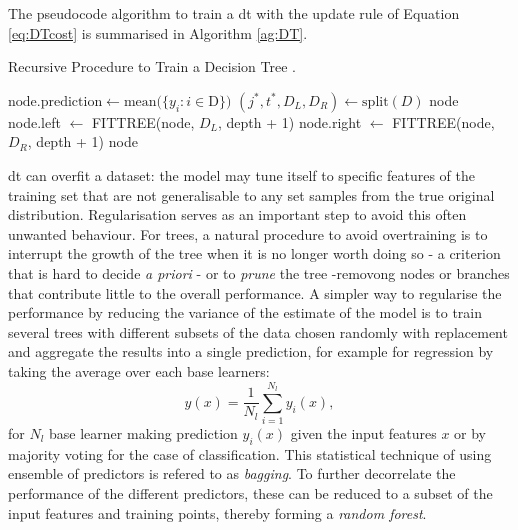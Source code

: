 The pseudocode algorithm to train a \gls{dt} with the update rule of Equation \ref{eq:DTcost} is summarised in Algorithm \ref{ag:DT}. 

\begin{algorithm}
    \caption{Recursive Procedure to Train a Decision Tree \cite{MurphyML}.}
    \begin{algorithmic}
        \State $\text{node.prediction} \gets \text{mean}(\{y_i : i \in $D$\})$ 
        \State $(j^*, t^*, D_L, D_R) \gets \text{split}(D)$
            \State \Return node
        \Else
            \State node.left $\gets$ FITTREE(node, $D_L$, depth + 1)
            \State node.right $\gets$ FITTREE(node, $D_R$, depth + 1)
            \State \Return node
        \EndIf
    \EndFunction
    \end{algorithmic}
    \label{ag:DT}
\end{algorithm}

\gls{dt} can overfit a dataset: the model may tune itself to specific features of the training set that are not generalisable to any set samples from the true original distribution. Regularisation serves as an important step to avoid this often unwanted behaviour. For trees, a natural procedure to avoid overtraining is to interrupt the growth of the tree when it is no longer worth doing so - a criterion that is hard to decide \textit{a priori} - or to \textit{prune} the tree -removong nodes or branches that contribute little to the overall performance. A simpler way to regularise the performance by reducing the variance of the estimate of the model is to train several trees with different subsets of the data chosen randomly with replacement and aggregate the results into a single prediction, for example for regression by taking the average over each base learners: \[ y(x) = \frac{1}{N_l} \sum_{i=1}^{N_l} y_i(x),\] for $N_l$ base learner making prediction $y_i(x)$ given the input features $x$ or by majority voting for the case of classification. This statistical technique of using ensemble of predictors is refered to as \textit{bagging}. To further decorrelate the performance of the different predictors, these can be reduced to a subset of the input features and training points, thereby forming a \textit{random forest}.

